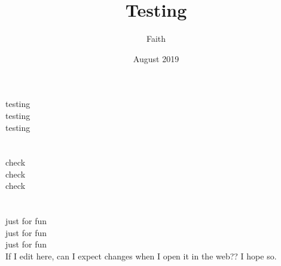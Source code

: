 \documentclass{article}
\title{Testing}
\date{August 2019}
\author{Faith}
\begin{document}
\maketitle
testing \\
testing\\
testing\\
\\
\\
check\\
check\\
check\\
\\
\\
just for fun
\\
just for fun
\\
just for fun
\\

If I edit here, can I expect changes when I open it in the web?? I hope so.
\end{document}
